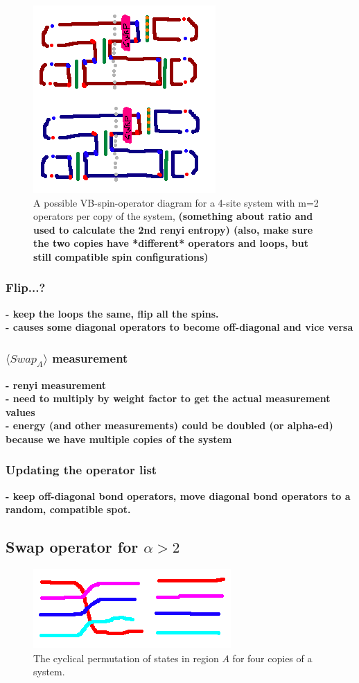 \documentclass[prb,aps,twocolumn,floatfix,amsmath,amssymb,superscriptaddress,tightenlines]{revtex4}
\begin{document}
\begin{figure} {
\includegraphics[width=2.4 in]{oplist.png} \caption{ 
\label{oplist} A possible VB-spin-operator diagram for a 4-site system with m=2 operators per copy of the system, {\bf (something about ratio and used to calculate the 2nd renyi entropy)
(also, make sure the two copies have *different* operators and loops, but still compatible spin configurations)}
}
} \end{figure}


\subsubsection{Flip...?}
\noindent 
{\bf
- keep the loops the same, flip all the spins.\\
- causes some diagonal operators to become off-diagonal and vice versa
}
\subsubsection{$\langle Swap_A \rangle$ measurement}
\noindent
{\bf 
- renyi measurement \\
- need to multiply by weight factor to get the actual measurement values\\
- energy (and other measurements) could be doubled (or alpha-ed) because we have multiple copies of the system
}
\subsubsection{Updating the operator list}
\noindent
{\bf- keep off-diagonal bond operators, move diagonal bond operators to a random, compatible spot.}
	
\subsection{Swap operator for $\alpha > 2$}

\begin{figure} {
\includegraphics[width=2.4 in]{swap.png} \caption{ 
\label{swap_4} 
The cyclical permutation of states in region $A$ for four copies of a system.
}
} \end{figure}


\end{document}
